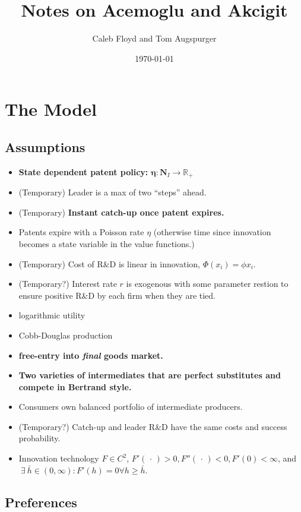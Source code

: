 \documentclass[11pt]{article}
\title{Notes on Acemoglu and Akcigit}
\author{Caleb Floyd and Tom Augspurger}
\date{\today}
\begin{document}
\maketitle

\section{The Model}
\label{sec:the_model}

\subsection{Assumptions}
\label{sub:assumptions}

  \begin{itemize}
    \item \textbf{State dependent patent policy:} $\mathbf{\eta} : \mathbf{N}_I \rightarrow \mathbb{R_+}$
    \item (Temporary) Leader is a max of two ``steps'' ahead.
    \item (Temporary) \textbf{Instant catch-up once patent expires.}
    \item Patents expire with a Poisson rate $\eta$ (otherwise time since innovation becomes a state variable in the value functions.)
    \item (Temporary) Cost of R\&D is linear in innovation, $\Phi(x_i) = \phi x_i$.
    \item (Temporary?) Interest rate $r$ is exogenous with some parameter restion to ensure positive R\&D by each firm when they are tied.
    \item logarithmic utility
    \item Cobb-Douglas production
    \item \textbf{free-entry into \emph{final} goods market.}
    \item \textbf{Two varieties of intermediates that are perfect substitutes and compete in Bertrand style.}
    \item Consumers own balanced portfolio of intermediate producers.
    \item (Temporary?) Catch-up and leader R\&D have the same costs and success probability.
    \item Innovation technology $F \in C^2$, $F'(\,\cdot\,) > 0, F''(\,\cdot\,) < 0, F'(0) < \infty$, and $\ \exists\ \bar{h} \in (0, \infty) : F'(h) = 0 \forall h \geq \bar{h}$.
  \end{itemize}

\subsection{Preferences}
\label{sub:preferences}
\end{document}
